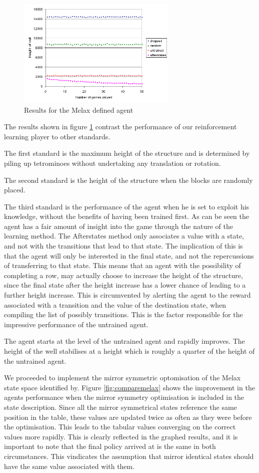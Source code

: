 \documentclass{rucsthesis}
\begin{document}
\begin{figure}[h]
\centering
\includegraphics[width=3in]{mymelaxresults.png}
\caption{Results for the Melax defined agent}
\label{fig:mymelaxresults}
\end{figure}

The results shown in figure \ref{fig:mymelaxresults} contrast the performance of our reinforcement learning player to other standards. 

The first standard is the maximum height of the structure and is determined by piling up tetrominoes without undertaking any translation or rotation.

The second standard is the height of the structure when the blocks are randomly placed.

The third standard is the performance of the agent when he is set to exploit his knowledge, without the benefits of having been trained first. As can be seen the agent has a fair amount of insight into the game through the nature of the learning method. The Afterstates method only associates a value with a state, and not with the transitions that lead to that state. The implication of this is that the agent will only be interested in the final state, and not the repercussions of transferring to that state. This means that an agent with the possibility of completing a row, may actually choose to increase the height of the structure, since the final state after the height increase has a lower chance of leading to a further height increase. This is circumvented by alerting the agent to the reward associated with a transition and the value of the destination state, when compiling the list of possibly transitions. This is the factor responsible for the impressive performance of the untrained agent.

The agent starts at the level of the untrained agent and rapidly improves. The height of the well stabilises at a height which is roughly a quarter of the height of the untrained agent.

We proceeded to implement the mirror symmetric optomisation of the Melax state space identified by\cite{yaeltetris}. Figure \ref{fig:comparemelax} shows the improvement in the agents performance when the mirror symmetry optimisation is included in the state description. Since all the mirror symmetrical states reference the same position in the table, these values are updated twice as often as they were before the optimisation. This leads to the tabular values converging on the correct values more rapidly. This is clearly reflected in the graphed results, and it is important to note that the final policy arrived at is the same in both circumstances. This vindicates the assumption that mirror identical states should have the same value associated with them.
\end{document}
